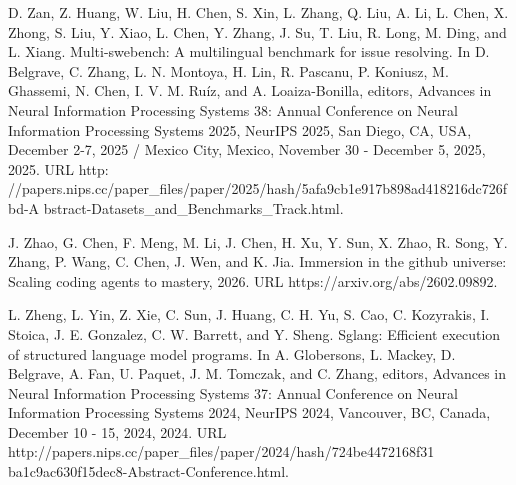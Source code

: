 D. Zan, Z. Huang, W. Liu, H. Chen, S. Xin, L. Zhang, Q. Liu, A. Li, L.
Chen, X. Zhong, S. Liu, Y. Xiao, L. Chen, Y. Zhang, J. Su, T. Liu, R.
Long, M. Ding, and L. Xiang. Multi-swebench: A multilingual benchmark
for issue resolving. In D. Belgrave, C. Zhang, L. N. Montoya, H. Lin, R.
Pascanu, P. Koniusz, M. Ghassemi, N. Chen, I. V. M. Ruíz, and A.
Loaiza-Bonilla, editors, Advances in Neural Information Processing
Systems 38: Annual Conference on Neural Information Processing Systems
2025, NeurIPS 2025, San Diego, CA, USA, December 2-7, 2025 / Mexico
City, Mexico, November 30 - December 5, 2025, 2025. URL http:
//papers.nips.cc/paper\_files/paper/2025/hash/5afa9cb1e917b898ad418216dc726fbd-A
bstract-Datasets\_and\_Benchmarks\_Track.html.

J. Zhao, G. Chen, F. Meng, M. Li, J. Chen, H. Xu, Y. Sun, X. Zhao, R.
Song, Y. Zhang, P. Wang, C. Chen, J. Wen, and K. Jia. Immersion in the
github universe: Scaling coding agents to mastery, 2026. URL
https://arxiv.org/abs/2602.09892.



L. Zheng, L. Yin, Z. Xie, C. Sun, J. Huang, C. H. Yu, S. Cao, C.
Kozyrakis, I. Stoica, J. E. Gonzalez, C. W. Barrett, and Y. Sheng.
Sglang: Efficient execution of structured language model programs. In A.
Globersons, L. Mackey, D. Belgrave, A. Fan, U. Paquet, J. M. Tomczak,
and C. Zhang, editors, Advances in Neural Information Processing Systems
37: Annual Conference on Neural Information Processing Systems 2024,
NeurIPS 2024, Vancouver, BC, Canada, December 10 - 15, 2024, 2024. URL
http://papers.nips.cc/paper\_files/paper/2024/hash/724be4472168f31
ba1c9ac630f15dec8-Abstract-Conference.html.
